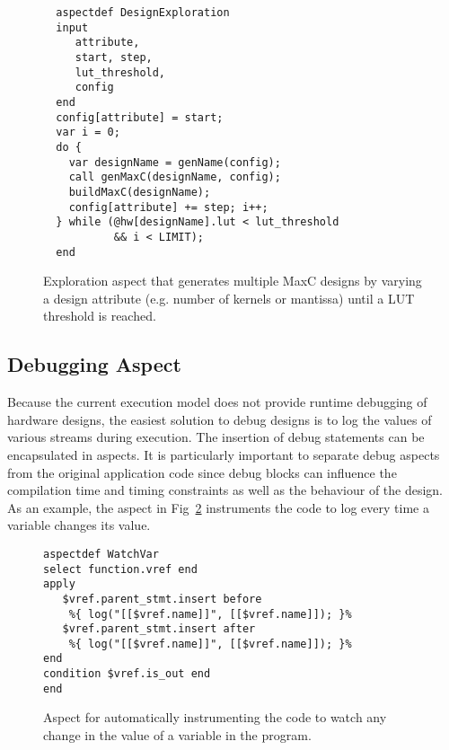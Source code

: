 \lstset{style=lara}
\begin{figure}[!h]
\begin{lstlisting}
  aspectdef DesignExploration
  input
     attribute,
     start, step,
     lut_threshold,
     config
  end
  config[attribute] = start; 
  var i = 0;
  do {        
    var designName = genName(config);
    call genMaxC(designName, config);
    buildMaxC(designName);
    config[attribute] += step; i++;
  } while (@hw[designName].lut < lut_threshold 
           && i < LIMIT);
  end
\end{lstlisting}
\caption{Exploration aspect that generates multiple MaxC designs by varying a design attribute (e.g. number of kernels or mantissa) until a LUT threshold is reached.}
\label{fig:aspect-exploration}
\end{figure}


\subsection{Debugging Aspect}
\label{sect:asp_debug}
Because the current execution model does not provide runtime debugging
of hardware designs, the easiest solution to debug designs is to log
the values of various streams during execution. The insertion of debug
statements can be encapsulated in aspects. It is particularly
important to separate debug aspects from the original application code
since debug blocks can influence the compilation time and timing
constraints as well as the behaviour of the design. As an example,
the aspect in Fig~\ref{fig:aspect-debug} instruments the code to log every time a variable changes its value.

\lstset{style=lara}
\begin{figure}[!h]
  \centering
\begin{lstlisting}
aspectdef WatchVar
select function.vref end
apply
   $vref.parent_stmt.insert before
    %{ log("[[$vref.name]]", [[$vref.name]]); }%
   $vref.parent_stmt.insert after
    %{ log("[[$vref.name]]", [[$vref.name]]); }%
end
condition $vref.is_out end
end
\end{lstlisting}
  \caption{Aspect for automatically instrumenting the code to watch any change in the value of a  variable in the program.}
  \label{fig:aspect-debug}
\end{figure}
